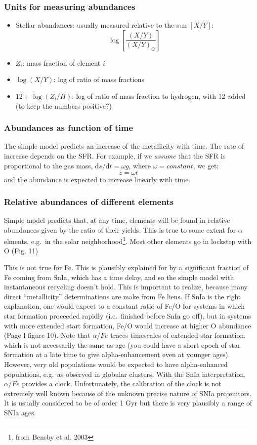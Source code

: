 \documentclass{article}
\begin{document}
\subsubsection{Units for measuring abundances}
\begin{itemize}
    \item Stellar abundances: usually measured relative to the sun
        $[X/Y]$:
        \[ \log\left[\frac{(X/Y)}{(X/Y)_{\odot}}\right] \]
    \item $Z_{i}$: mass fraction of element $i$
    \item $\log(X/Y)$: log of ratio of mass fractions
    \item $12 + \log(Z_{i}/H)$: log of ratio of mass fraction to hydrogen,
        with 12 added (to keep the numbers positive?)
\end{itemize}

\subsubsection{Abundances as function of time}
The simple model predicts an increase of the metallicity with time.
The rate of increase depends on the SFR.
For example, if we \emph{assume} that the SFR is proportional to the
gas mass, $\mathrm{d}s/\mathrm{d}t = \omega{g}$, where $\omega = constant$,
we get:
\[
    z = \omega{t}
    \]
and the abundance is expected to increase linearly with time.

\subsubsection{Relative abundances of different elements}
Simple model predicts that, at any time, elements will be found in relative
abundances given by the ratio of their yields. This is true to some extent
for $\alpha$ elments, e.g.\ in the solar neighborhood\footnote{from
Bensby et al. 2003}. Most other elements go in lockstep with O (Fig. 11)

This is not true for Fe. This is plausibly explained for by a significant
fraction of Fe coming from SnIa, which has a time delay, and so the simple
model with instantaneous recycling doesn't hold. This is important to realize,
because many direct ``metallicity'' determinations are make from Fe liens.
If SnIa is the right explanation, one would expect to a constant ratio
of Fe/O for systems in which star formation proceeded rapidly (i.e.\ finished
before SnIa go off), but in systems with more extended start formation,
Fe/O would increase at higher O abundance (Page l figure 10).
Note that $\alpha/Fe$ traces timescales of extended star formation,
which is not necessarily the same as age (you could have a short epoch
of star formation at a late time to give alpha-enhancement even at younger
ages). However, very old populations would be expected to have alpha-enhanced
populations, e.g.\ as observed in globular clusters.
With the SnIa interpretation, $\alpha/Fe$ provides a clock. Unfortunately,
the calibration of the clock is not extremely well known because of the
unknown precise nature of SNIa projenitors. It is usually considered
to be of order 1 Gyr but there is very plausibly a range of SNIa ages.
\end{document}
